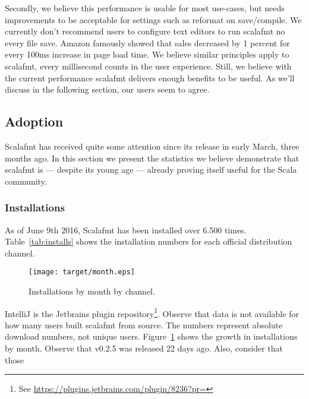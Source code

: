 Secondly, we believe this performance is usable for most use-cases, but needs improvements to be acceptable for settings such as reformat on save/compile.
We currently don't recommend users to configure text editors to run scalafmt no every file save.
Amazon famously showed that sales decreased by 1 percent for every 100ms increase in page load time\autocite{kohavi2007online}.
We believe similar principles apply to scalafmt, every millisecond counts in the user experience.
Still, we believe with the current performance scalafmt delivers enough benefits to be useful.
As we'll discuss in the following section, our users seem to agree.

\subsection{Adoption}\label{sec:adoption}
Scalafmt has received quite some attention since its release in early March, three months ago.
In this section we present the statistics we believe demonstrate that scalafmt is --- despite its young age --- already proving itself useful for the Scala community.

\subsubsection{Installations}
As of June 9th 2016, Scalafmt has been installed over 6.500 times.
  Table~\ref{tab:installs} shows the installation numbers for each official distribution channel.
  \begin{figure}
    \CenterFloatBoxes
    \begin{floatrow}
      \ffigbox
      {\texttt{[image: target/month.eps]}}
      {\caption{Installations by month by channel.}\label{fig:installs}}
      \killfloatstyle
    \end{floatrow}
  \end{figure}
IntelliJ is the Jetbrains plugin repository\footnote{
  See \url{https://plugins.jetbrains.com/plugin/8236?pr=}
}.
Observe that data is not available for how many users built scalafmt from source.
The numbers represent absolute download numbers, not unique users.
Figure~\ref{fig:installs} shows the growth in installations by month.
Observe that v0.2.5 was released 22 days ago.
Also, consider that those



